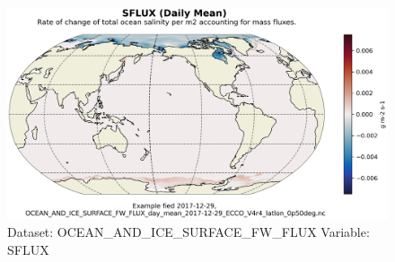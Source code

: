 \begin{figure}[H]
\centering
\includegraphics[scale=0.55]{../images/plots/latlon_plots/Ocean_and_Sea-Ice_Surface_Freshwater_Fluxes/SFLUX.png}
\caption{Dataset: OCEAN\_AND\_ICE\_SURFACE\_FW\_FLUX Variable: SFLUX}
\label{tab:table-OCEAN_AND_ICE_SURFACE_FW_FLUX_SFLUX-Plot}
\end{figure}
\pagebreak
